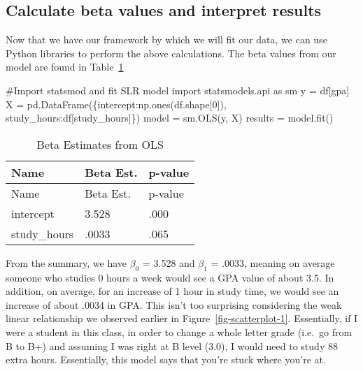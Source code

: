 \documentclass[
  letterpaper,
  DIV=11,
  numbers=noendperiod]{scrreprt}
\newenvironment{Shaded}{\begin{snugshade}}{\end{snugshade}}
\newcommand{\CommentTok}[1]{\textcolor[rgb]{0.37,0.37,0.37}{#1}}
\newcommand{\DecValTok}[1]{\textcolor[rgb]{0.68,0.00,0.00}{#1}}
\newcommand{\ImportTok}[1]{\textcolor[rgb]{0.00,0.46,0.62}{#1}}
\newcommand{\NormalTok}[1]{\textcolor[rgb]{0.00,0.23,0.31}{#1}}
\newcommand{\OperatorTok}[1]{\textcolor[rgb]{0.37,0.37,0.37}{#1}}
\newcommand{\StringTok}[1]{\textcolor[rgb]{0.13,0.47,0.30}{#1}}
\begin{document}
\hypertarget{calculate-beta-values-and-interpret-results}{%
\subsection{Calculate beta values and interpret
results}\label{calculate-beta-values-and-interpret-results}}

Now that we have our framework by which we will fit our data, we can use
Python libraries to perform the above calculations. The beta values from
our model are found in Table~\ref{tbl-beta-estimates}

\begin{Shaded}
\begin{Highlighting}[]
\CommentTok{\#Import statsmod and fit SLR model}
\ImportTok{import}\NormalTok{ statsmodels.api }\ImportTok{as}\NormalTok{ sm}
\NormalTok{y }\OperatorTok{=}\NormalTok{ df[}\StringTok{\textquotesingle{}gpa\textquotesingle{}}\NormalTok{]}
\NormalTok{X }\OperatorTok{=}\NormalTok{ pd.DataFrame(\{}\StringTok{\textquotesingle{}intercept\textquotesingle{}}\NormalTok{:np.ones(df.shape[}\DecValTok{0}\NormalTok{]), }\StringTok{\textquotesingle{}study\_hours\textquotesingle{}}\NormalTok{:df[}\StringTok{\textquotesingle{}study\_hours\textquotesingle{}}\NormalTok{]\})}
\NormalTok{model }\OperatorTok{=}\NormalTok{ sm.OLS(y, X)}
\NormalTok{results }\OperatorTok{=}\NormalTok{ model.fit()}
\end{Highlighting}
\end{Shaded}

\hypertarget{tbl-beta-estimates}{}
\begin{longtable}[]{@{}lll@{}}
\caption{\label{tbl-beta-estimates}Beta Estimates from
OLS}\tabularnewline
\toprule\noalign{}
Name & Beta Est. & p-value \\
\midrule\noalign{}
\endfirsthead
\toprule\noalign{}
Name & Beta Est. & p-value \\
\midrule\noalign{}
\endhead
\bottomrule\noalign{}
\endlastfoot
intercept & 3.528 & .000 \\
study\_hours & .0033 & .065 \\
\end{longtable}

From the summary, we have \(\beta_0\) = 3.528 and \(\beta_1\) = .0033,
meaning on average someone who studies 0 hours a week would see a GPA
value of about 3.5. In addition, on average, for an increase of 1 hour
in study time, we would see an increase of about .0034 in GPA. This
isn't too surprising considering the weak linear relationship we
observed earlier in Figure~\ref{fig-scatterplot-1}. Essentially, if I
were a student in this class, in order to change a whole letter grade
(i.e.~go from B to B+) and assuming I was right at B level (3.0), I
would need to study 88 extra hours. Essentially, this model says that
you're stuck where you're at.
\end{document}
